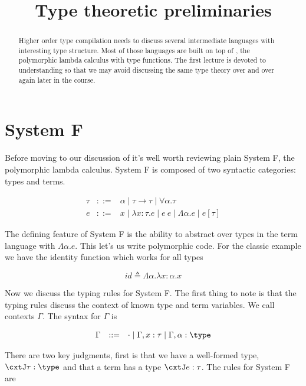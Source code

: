 \documentclass{amsart}
\title{Type theoretic preliminaries}
\begin{document}
\maketitle

\begin{abstract}
  Higher order type compilation needs to discuss several intermediate languages with interesting type structure. Most of those languages are built on top
  of \Fomega, the polymorphic lambda calculus with type
  functions. The first lecture is devoted to understanding \Fomega
  so that we may avoid discussing the same type theory over and over
  again later in the course.
\end{abstract}

\section{System F}

Before moving to our discussion of \Fomega it's well worth
reviewing plain System F, the polymorphic lambda calculus. System F is
composed of two syntactic categories: types and terms.

\[
\begin{array}{lcl}
  \tau & ::= & \alpha \mid \tau \to \tau \mid \forall \alpha. \tau\\
  e & ::= & x \mid \lambda x : \tau. e \mid e\ e \mid
            \Lambda \alpha. e \mid e[\tau]
\end{array}
\]

The defining feature of System F is the ability to abstract over types
in the term language with $\Lambda \alpha. e$. This let's us write
polymorphic code. For the classic example we have the identity
function which works for all types

\[
  id \triangleq \Lambda \alpha. \lambda x : \alpha. x
\]

Now we discuss the typing rules for System F. The first thing to note
is that the typing rules discuss the context of known type and term
variables. We call contexts $\Gamma$. The syntax for $\Gamma$ is

\[
\begin{array}{lcl}
  \Gamma & ::= & \cdot \mid \Gamma, x : \tau \mid \Gamma, \alpha : \type
\end{array}
\]

There are two key
judgments, first is that we have a well-formed type, $\cxtJ
\tau : \type$ and that a term has a type $\cxtJ e : \tau$. The
rules for System F are
\end{document}
